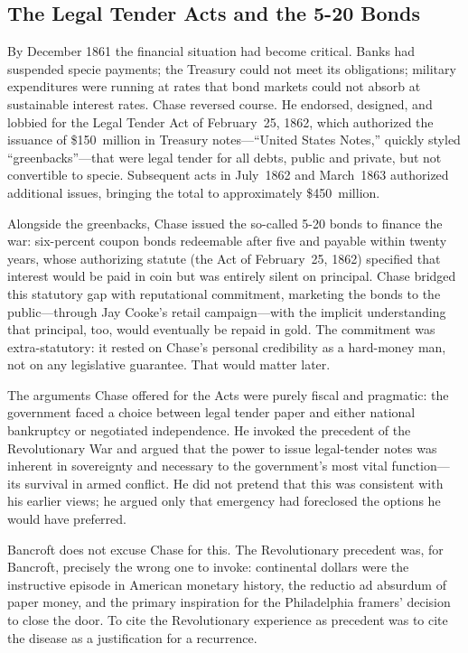 \documentclass[12pt]{article}
\begin{document}
\subsection{The Legal Tender Acts and the 5-20 Bonds}

By December 1861 the financial situation had become critical.  Banks had
suspended specie payments; the Treasury could not meet its obligations;
military expenditures were running at rates that bond markets could not
absorb at sustainable interest rates.  Chase reversed course.
He endorsed, designed, and lobbied for the Legal Tender Act
of February~25, 1862, which authorized the issuance of \$150~million in
Treasury notes---``United States Notes,'' quickly styled
``greenbacks''---that were legal tender for all debts, public and
private, but not convertible to specie.  Subsequent acts in July~1862
and March~1863 authorized additional issues, bringing the total to
approximately \$450~million.

Alongside the greenbacks, Chase issued the so-called 5-20 bonds to
finance the war: six-percent coupon bonds redeemable after five and
payable within twenty years, whose authorizing statute (the Act of
February~25, 1862) specified that interest would be paid in coin but
was entirely silent on principal.  Chase bridged this statutory gap with
reputational commitment, marketing the bonds to the public---through Jay
Cooke's retail campaign---with the implicit understanding that
principal, too, would eventually be repaid in gold.  The commitment was
extra-statutory: it rested on Chase's personal credibility as a
hard-money man, not on any legislative guarantee.  That would matter later.

The arguments Chase offered for the Acts were purely fiscal and
pragmatic: the government faced a choice between legal tender paper and
either national bankruptcy or negotiated independence.  He invoked the
precedent of the Revolutionary War and argued that the power to issue
legal-tender notes was inherent in sovereignty and necessary to the
government's most vital function---its survival in armed conflict.  He
did not pretend that this was consistent with his earlier views; he
argued only that emergency had foreclosed the options he would have
preferred.

Bancroft does not excuse Chase for this.  The Revolutionary precedent
was, for Bancroft, precisely the wrong one to invoke: continental
dollars were the instructive episode in American monetary
history, the reductio ad absurdum of paper money, and the primary
inspiration for the Philadelphia framers' decision to close the door.
To cite the Revolutionary experience as precedent was to cite the
disease as a justification for a recurrence.
\end{document}
